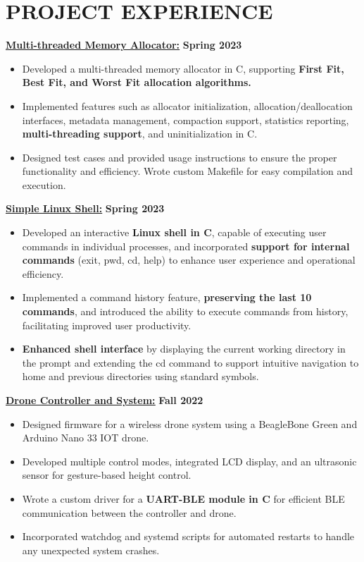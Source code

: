 \documentclass[letterpaper,11pt]{article}
\newcommand{\Item} [1] {
    \item\small{{#1 \vspace{-2pt}}}
}
\newcommand{\resumeItemListStart} [0] {
    \vspace{2pt}
    \begin{itemize}[topsep=0pt,itemsep=-2pt]
}
\newcommand{\resumeItemListEnd} [0] {
    \end{itemize}
    \vspace{5pt}
}
\begin{document}
    \section{PROJECT EXPERIENCE}
    \href{https://github.com/SatireSage/Multi-threaded-Memory-Allocator}{{\color{colorValue}} \underline{\textbf{Multi-threaded Memory Allocator:}}} \hfill \textbf{Spring 2023}
    \resumeItemListStart{}
        \Item{Developed a multi-threaded memory allocator in C, supporting \textbf{First Fit, Best Fit, and Worst Fit allocation algorithms.}}
        \Item{Implemented features such as allocator initialization, allocation/deallocation interfaces, metadata management, compaction support, statistics reporting,  \textbf{multi-threading support}, and uninitialization in C.}
        \Item{Designed test cases and provided usage instructions to ensure the proper functionality and efficiency. Wrote custom Makefile for easy compilation and execution.}
    \resumeItemListEnd{}
    \href{https://github.com/SatireSage/Simple-Linux-Shell}{{\color{colorValue}} \underline{\textbf{Simple Linux Shell:}}} \hfill \textbf{Spring 2023}
    \resumeItemListStart{}
        \Item{Developed an interactive \textbf{Linux shell in C}, capable of executing user commands in individual processes, and incorporated \textbf{support for internal commands} (exit, pwd, cd, help) to enhance user experience and operational efficiency.}
        \Item{Implemented a command history feature, \textbf{preserving the last 10 commands}, and introduced the ability to execute commands from history, facilitating improved user productivity.}
        \Item{\textbf{Enhanced shell interface} by displaying the current working directory in the prompt and extending the cd command to support intuitive navigation to home and previous directories using standard symbols.}
    \resumeItemListEnd{}
    \href{https://github.com/SatireSage/Dronee}{{\color{colorValue}} \underline{\textbf{Drone Controller and System:}}} \hfill \textbf{Fall 2022}
    \resumeItemListStart{}
        \Item{Designed firmware for a wireless drone system using a BeagleBone Green and Arduino Nano 33 IOT drone.}
        \Item{Developed multiple control modes, integrated LCD display, and an ultrasonic sensor for gesture-based height control.}
        \Item{Wrote a custom driver for a \textbf{UART-BLE module in C} for efficient BLE communication between the controller and drone.}
        \Item{Incorporated watchdog and systemd scripts for automated restarts to handle any unexpected system crashes.}
    \resumeItemListEnd{}
\end{document}
